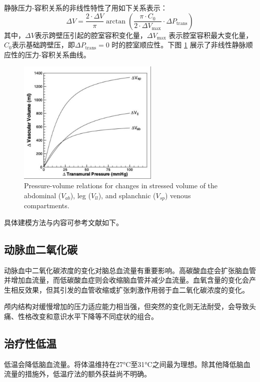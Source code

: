 \documentclass[12pt,a4paper]{article} %
\begin{document}
    静脉压力-容积关系的非线性特性了用如下关系表示：
\begin{equation*}
    \Delta V = \frac{2 \cdot \Delta V}{\pi} \arctan \left( \frac{\pi \cdot C_0}{2 \cdot \Delta V_{\text{max}}} \cdot \Delta P_{\text{trans}} \right)
\end{equation*}
其中，$\Delta V$表示跨壁压引起的腔室容积变化量，$\Delta V_{\text{max}}$ 表示腔室容积最大变化量，$C_0$表示基础跨壁压，即$\Delta P_{\text{trans}} = 0$ 时的腔室顺应性。下图 \ref{fig:nonlinear-compliance} 展示了非线性静脉顺应性的压力-容积关系曲线。
\begin{figure}[htbp]
    \centering
    \includegraphics[width=0.6\textwidth]{figures/非线性顺应性.png}
    \caption{Pressure-volume relations for changes in stressed volume of the abdominal ($ V_{ab}$), leg ($V_{ll}$), and splanchnic ($V_{sp}$) venous compartments.}
    \label{fig:nonlinear-compliance}
\end{figure}
具体建模方法与内容可参考文献如下\cite{heldtComputationalModelingCardiovascular2002}。

\subsection{动脉血二氧化碳}
动脉血中二氧化碳浓度的变化对脑总血流量有重要影响。高碳酸血症会扩张脑血管并增加血流量，而低碳酸血症则会收缩脑血管并减少血流量。血氧含量的变化会产生相反效果，但其引发的血管收缩或扩张刺激作用弱于血二氧化碳浓度的变化\cite{pina-garzaChapter4Increased2013}。

颅内结构对缓慢增加的压力适应能力相当强，但突然的变化则无法耐受，会导致头痛、性格改变和意识水平下降等不同症状的组合。

\subsection{治疗性低温}
低温会降低脑血流量。将体温维持在27°C至31°C之间最为理想。除其他降低脑血流量的措施外，低温疗法的额外获益尚不明确\cite{pina-garzaChapter4Increased2013}。
\end{document}
